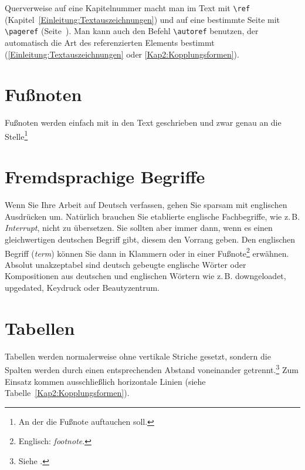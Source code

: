 Querverweise auf eine Kapitelnummer macht man im Text mit \verb+\ref+ (Kapitel~\ref{Einleitung:Textauszeichnungen}) und auf eine bestimmte Seite mit \verb+\pageref+ (Seite~\pageref{Einleitung:Textauszeichnungen}). Man kann auch den Befehl \verb+\autoref+ benutzen, der automatisch die Art des referenzierten Elements bestimmt (\zb \autoref{Einleitung:Textauszeichnungen} oder \autoref{Kap2:Kopplungsformen}).


\section{Fußnoten}

Fußnoten werden einfach mit in den Text geschrieben und zwar genau an die Stelle\footnote{An der die Fußnote auftauchen soll.}



\section{Fremdsprachige Begriffe}

Wenn Sie Ihre Arbeit auf Deutsch verfassen, gehen Sie sparsam mit englischen Ausdrücken um. Natürlich brauchen Sie etablierte englische Fachbegriffe, wie z.\,B. \textit{Interrupt}, nicht zu übersetzen. Sie sollten aber immer dann, wenn es einen gleichwertigen deutschen Begriff gibt, diesem den Vorrang geben. Den englischen Begriff (\textit{term}) können Sie dann in Klammern oder in einer Fußnote\footnote{Englisch: \textit{footnote}.} erwähnen. Absolut unakzeptabel sind deutsch gebeugte englische Wörter oder Kompositionen aus deutschen und englischen Wörtern wie z.\,B. downgeloadet, upgedated, Keydruck oder Beautyzentrum.



\section{Tabellen}

Tabellen werden normalerweise ohne vertikale Striche gesetzt, sondern die Spalten werden durch einen entsprechenden Abstand voneinander getrennt.\footnote{Siehe \cite[S. 89]{Willberg1999}.} Zum Einsatz kommen ausschließlich horizontale Linien (siehe Tabelle~\ref{Kap2:Kopplungsformen}).

